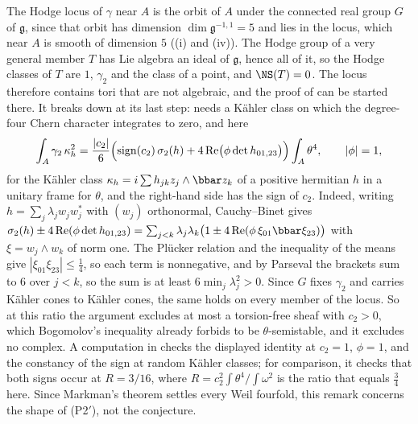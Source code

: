 \begin{remark}[The exceptional ratio at $n=2$]
The Hodge locus of $\gamma$ near $A$ is the orbit of $A$ under the connected
real group $G$ of $\mathfrak{g}$, since that orbit has dimension
$\dim\mathfrak{g}^{-1,1}=5$ and lies in the locus, which near $A$ is smooth of
dimension $5$ ((i) and (iv)). The Hodge group of a
very general member $T$ has Lie algebra an ideal of $\mathfrak{g}$, hence all
of it, so the Hodge classes of $T$ are $1$, $\gamma_{2}$ and the class of a
point, and $\NS(T)=0$. The locus therefore contains tori that are not
algebraic, and the proof of  can be started there. It
breaks down at its last step:  needs a K\"ahler
class on which the degree-four Chern character integrates to zero, and here
\[
  \int_{A}\gamma_{2}\,\kappa_{h}^{2}
  =\frac{|c_{2}|}{6}\Bigl(\operatorname{sign}(c_{2})\,\sigma_{2}(h)
    +4\operatorname{Re}\bigl(\phi\det h_{01,23}\bigr)\Bigr)\int_{A}\theta^{4},
  \qquad|\phi|=1,
\]
for the K\"ahler class $\kappa_{h}=i\sum h_{jk}z_{j}\wedge\bbar z_{k}$ of a
positive hermitian $h$ in a unitary frame for $\theta$, and the right-hand
side has the sign of $c_{2}$. Indeed, writing
$h=\sum_{j}\lambda_{j}w_{j}w_{j}^{*}$ with $(w_{j})$ orthonormal,
Cauchy--Binet gives
$\sigma_{2}(h)\pm4\operatorname{Re}(\phi\det h_{01,23})
=\sum_{j<k}\lambda_{j}\lambda_{k}\bigl(1\pm4\operatorname{Re}(\phi\,\xi_{01}\bbar\xi_{23})\bigr)$
with $\xi=w_{j}\wedge w_{k}$ of norm one. The Pl\"ucker relation and the
inequality of the means give $|\xi_{01}\xi_{23}|\le\frac14$, so each term is
nonnegative, and by Parseval the brackets sum to $6$ over $j<k$, so the sum is
at least $6\min_{j}\lambda_{j}^{2}>0$. Since $G$ fixes $\gamma_{2}$ and carries
K\"ahler cones to K\"ahler cones, the same holds on every member of the locus.
So at this ratio the argument excludes at most a torsion-free sheaf with
$c_{2}>0$, which Bogomolov's inequality already forbids to be
$\theta$-semistable, and it excludes no complex. A computation in \cite{BMB26} checks the
displayed identity at $c_{2}=1$, $\phi=1$, and the constancy of the sign at
random K\"ahler classes; for comparison, it checks that both signs occur at
$R=3/16$, where $R=c_{2}^{2}\int\theta^{4}\big/\!\int\omega^{2}$ is the ratio
that equals $\frac34$ here. Since Markman's theorem settles every Weil
fourfold, this remark concerns the shape of \textup{(P2$'$)}, not the
conjecture.
\end{remark}

